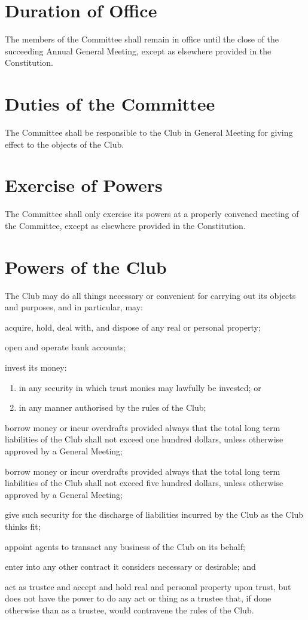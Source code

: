 \documentclass[11pt]{article} %
\begin{document}
\section{Duration of Office}
The members of the Committee shall remain in office until the close of the succeeding Annual General Meeting, except as elsewhere provided in the Constitution.

\section{Duties of the Committee}
The Committee shall be responsible to the Club in General Meeting for giving effect to the objects of the Club.

\section{Exercise of Powers}
The Committee shall only exercise its powers at a properly convened meeting of the Committee, except as elsewhere provided in the Constitution.

\section{Powers of the Club}
The Club may do all things necessary or convenient for carrying out its objects and purposes, and in particular, may:
\begin{enumerate}
	\item acquire, hold, deal with, and dispose of any real or personal property;
	\item open and operate bank accounts;
	\item invest its money:
	\begin{enumerate}[1.]
			\item in any security in which trust monies may lawfully be invested; or
			\item in any manner authorised by the rules of the Club;
		\end{enumerate}
	{\color{red} \item borrow money or incur overdrafts provided always that the total long term liabilities of the Club shall not exceed one hundred dollars, unless otherwise approved by a General Meeting;}
	{\color{ForestGreen} \item borrow money or incur overdrafts provided always that the total long term liabilities of the Club shall not exceed five hundred dollars, unless otherwise approved by a General Meeting;}
	\item give such security for the discharge of liabilities incurred by the Club as the Club thinks fit;
	\item appoint agents to transact any business of the Club on its behalf;
	\item enter into any other contract it considers necessary or desirable; and
	\item act as trustee and accept and hold real and personal property upon trust, but does not have the power to do any act or thing as a trustee that, if done otherwise than as a trustee, would contravene the rules of the Club.
\end{enumerate}
\end{document}
